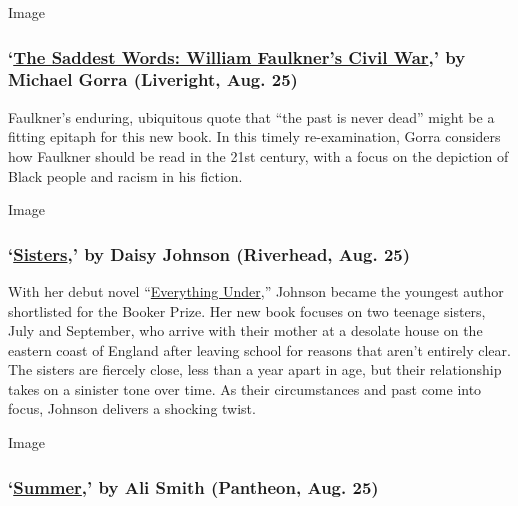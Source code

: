 Image

\hypertarget{the-saddest-words-william-faulkners-civil-war-by-michael-gorra-liveright-aug-25}{%
\subsubsection{\texorpdfstring{`\href{https://wwnorton.com/books/9781631491702}{The
Saddest Words: William Faulkner's Civil War},' by Michael Gorra
(Liveright, Aug.
25)}{`The Saddest Words: William Faulkner's Civil War,' by Michael Gorra (Liveright, Aug. 25)}}\label{the-saddest-words-william-faulkners-civil-war-by-michael-gorra-liveright-aug-25}}

Faulkner's enduring, ubiquitous quote that ``the past is never dead''
might be a fitting epitaph for this new book. In this timely
re-examination, Gorra considers how Faulkner should be read in the 21st
century, with a focus on the depiction of Black people and racism in his
fiction.

Image

\hypertarget{sisters-by-daisy-johnson-riverhead-aug-25}{%
\subsubsection{\texorpdfstring{`\href{https://www.penguinrandomhouse.com/books/624960/sisters-by-daisy-johnson/}{Sisters},'
by Daisy Johnson (Riverhead, Aug.
25)}{`Sisters,' by Daisy Johnson (Riverhead, Aug. 25)}}\label{sisters-by-daisy-johnson-riverhead-aug-25}}

With her debut novel
``\href{https://www.nytimes.com/2018/11/20/books/review/daisy-johnson-everything-under.html}{Everything
Under},'' Johnson became the youngest author shortlisted for the Booker
Prize. Her new book focuses on two teenage sisters, July and September,
who arrive with their mother at a desolate house on the eastern coast of
England after leaving school for reasons that aren't entirely clear. The
sisters are fiercely close, less than a year apart in age, but their
relationship takes on a sinister tone over time. As their circumstances
and past come into focus, Johnson delivers a shocking twist.

Image

\hypertarget{summer-by-ali-smith-pantheon-aug-25}{%
\subsubsection{\texorpdfstring{`\href{https://www.penguinrandomhouse.com/books/259057/summer-by-ali-smith/}{Summer},'
by Ali Smith (Pantheon, Aug.
25)}{`Summer,' by Ali Smith (Pantheon, Aug. 25)}}\label{summer-by-ali-smith-pantheon-aug-25}}

